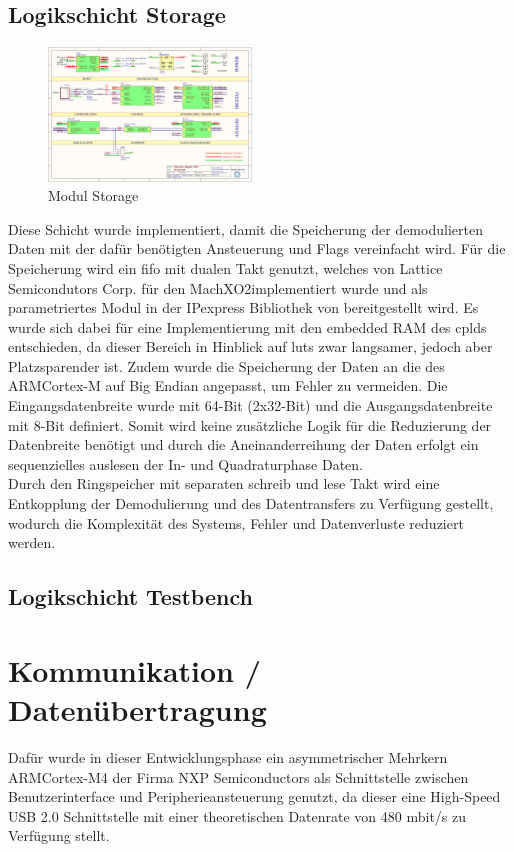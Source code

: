 \subsection{Logikschicht Storage}
\begin{figure}[h!]
	\centering
	\includegraphics[page=11,width=0.48\textwidth, trim=111mm 89mm 127mm 81mm, clip=true]{images/pcb/new.PDF}%
	\caption{Modul Storage}
	\label{fig:layer_fifo}
\end{figure}
Diese Schicht wurde implementiert, damit die Speicherung der demodulierten Daten mit der dafür benötigten Ansteuerung und Flags vereinfacht wird. Für die Speicherung wird ein \ac{fifo} mit dualen Takt genutzt, welches von Lattice Semicondutors Corp. für den MachXO2\SymbTM implementiert wurde und als parametriertes Modul in der IPexpress Bibliothek von \SymbTM bereitgestellt wird. Es wurde sich dabei für eine Implementierung mit den embedded RAM des \ac{cpld}s entschieden, da dieser Bereich in Hinblick auf \ac{lut}s zwar langsamer, jedoch aber Platzsparender ist. Zudem wurde die Speicherung der Daten an die des ARM\SymbReg Cortex\SymbReg-M auf Big Endian angepasst, um Fehler zu vermeiden. Die Eingangsdatenbreite wurde mit 64-Bit (2x32-Bit) und die Ausgangsdatenbreite mit 8-Bit definiert. Somit wird keine zusätzliche Logik für die Reduzierung der Datenbreite benötigt und durch die Aneinanderreihung der Daten erfolgt ein sequenzielles auslesen der In- und Quadraturphase Daten.\\
Durch den Ringspeicher mit separaten schreib und lese Takt wird eine Entkopplung der Demodulierung und des Datentransfers zu Verfügung gestellt, wodurch die Komplexität des Systems, Fehler und Datenverluste reduziert werden.
 
\subsection{Logikschicht Testbench}

\newpage
\section{Kommunikation / Datenübertragung}
Dafür wurde in dieser Entwicklungsphase ein asymmetrischer Mehrkern ARM\SymbReg Cortex\SymbReg-M4 der Firma NXP Semiconductors als Schnittstelle zwischen Benutzerinterface und Peripherieansteuerung genutzt, da dieser eine High-Speed USB 2.0 Schnittstelle mit einer theoretischen Datenrate von 480 mbit/s zu Verfügung stellt.
